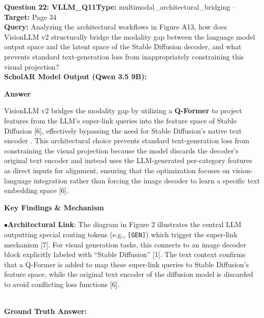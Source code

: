 \documentclass[10pt,a4paper]{article}
\begin{document}
\begin{tcolorbox}[questionbox]
{\noindent\bfseries\large\color{navy} Question 22: VLLM\_Q11}\hfill {\footnotesize\color{darkteal}\textbf{Type:} multimodal\_architectural\_bridging $\cdot$ \textbf{Target:} Page 34}\\[4pt]
{\noindent\bfseries\color{accentblue} Query: } Analyzing the architectural workflows in Figure A13, how does VisionLLM v2 structurally bridge the modality gap between the language model output space and the latent space of the Stable Diffusion decoder, and what prevents standard text-generation loss from inappropriately constraining this visual projection?\\[6pt]
{\noindent\bfseries\color{navy} ScholAR Model Output (Qwen 3.5 9B):}\\[2pt]
{\small \noindent \textbf{Answer}\par\vspace{3pt}VisionLLM v2 bridges the modality gap by utilizing a \textbf{Q-Former} to project features from the LLM's super-link queries into the feature space of Stable Diffusion [6], effectively bypassing the need for Stable Diffusion's native text encoder . This architectural choice prevents standard text-generation loss from constraining the visual projection because the model discards the decoder's original text encoder and instead uses the LLM-generated per-category features as direct inputs for alignment, ensuring that the optimization focuses on vision-language integration rather than forcing the image decoder to learn a specific text embedding space [6].\par\vspace{3pt}\noindent \textbf{Key Findings \& Mechanism}\par\vspace{3pt}\noindent\hspace*{8pt}$\bullet$\hspace*{4pt}\textbf{Architectural Link}: The diagram in Figure 2 illustrates the central LLM outputting special routing tokens (e.g., \texttt{[GEN]}) which trigger the super-link mechanism [7]. For visual generation tasks, this connects to an image decoder block explicitly labeled with ``Stable Diffusion'' [1]. The text context confirms that a Q-Former is added to map these super-link queries to Stable Diffusion's feature space, while the original text encoder of the diffusion model is discarded to avoid conflicting loss functions [6].}\\[6pt]
{\noindent\bfseries\color{darkteal} Ground Truth Answer:}\\[2pt]

\end{tcolorbox}
\end{document}
